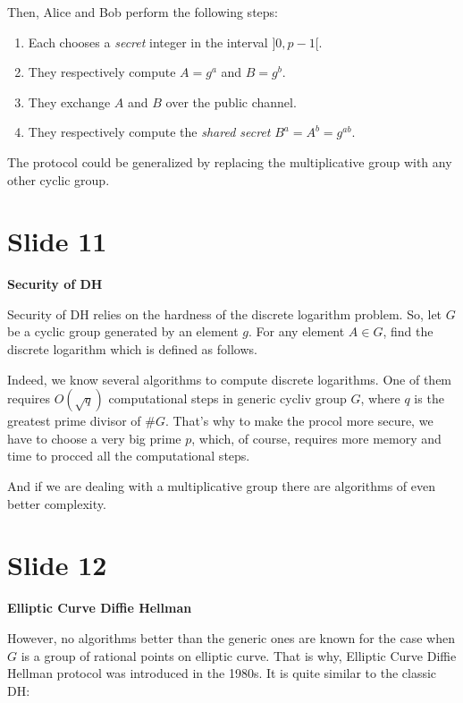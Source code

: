 \documentclass[10 pt]{article}
\begin{document}
{\begin{itemize}
\end{itemize}
Then, Alice and Bob perform the following steps:

\begin{enumerate}
	\item Each chooses a \textit{secret} integer in the interval $]0, p - 1[$.
	
	\item They respectively compute $A = g^a$ and $B = g^b$.
	
	\item They exchange $A$ and $B$ over the public channel.
	
	\item They respectively compute the \textit{shared secret} $B^a = A^b = g^{ab}$.
\end{enumerate}
 
The protocol could be generalized by replacing the multiplicative group with any other cyclic group.

\section{Slide 11} \large{\textbf{Security of DH}}

Security of DH relies on the hardness of the discrete logarithm problem. So, let $G$ be a cyclic group generated by an element $g$. For any element $A \in G$, find the discrete logarithm which is defined as follows.

Indeed, we know several algorithms to compute discrete logarithms. One of them requires $O(\sqrt{q})$ computational steps in generic cycliv group $G$, where $q$ is the greatest prime divisor of $\#G$. That's why to make the procol more secure, we have to choose a very big prime $p$, which, of course, requires more memory and time to procced all the computational steps. 

And if we are dealing with a multiplicative group there are algorithms of even better complexity.

\section{Slide 12} \large{\textbf{Elliptic Curve Diffie Hellman}} 

However, no algorithms better than the generic ones are known for the case when $G$ is a group of rational points on elliptic curve. That is why, Elliptic Curve Diffie Hellman protocol was introduced in the 1980s. It is quite similar to the classic DH:

}
\end{document}
